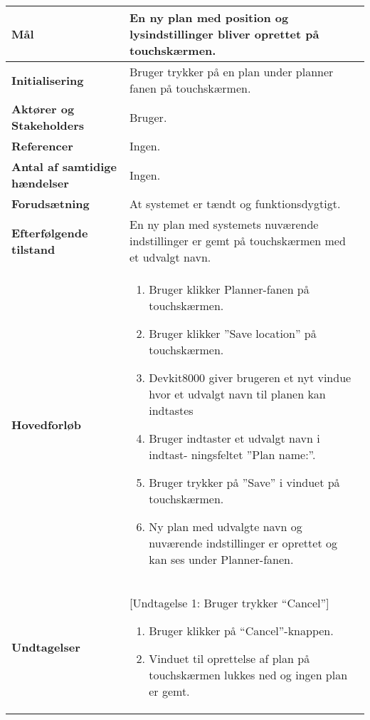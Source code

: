 \begin{center}
\begin{longtable}{|p{6cm}|p{8cm}|}
        \textbf{Mål}								
            & En ny plan med position og lysindstillinger bliver oprettet på touchskærmen.
        \\ \hline
        \textbf{Initialisering}					
            & Bruger trykker på en plan under planner fanen på touchskærmen.
        \\ \hline
        \textbf{Aktører og Stakeholders}			
            & Bruger.
        \\ \hline
        \textbf{Referencer}						
            & Ingen.
        \\ \hline
        \textbf{Antal af samtidige hændelser}	
            & Ingen.
        \\ \hline
        \textbf{Forudsætning}					
            & At systemet er tændt og funktionsdygtigt.
        \\ \hline
        \textbf{Efterfølgende tilstand}			
            & En ny plan med systemets nuværende indstillinger er gemt på touchskærmen med et udvalgt navn.
        \\ \hline
        \textbf{Hovedforløb}						
            &
            \begin{enumerate}
                \item Bruger klikker Planner-fanen på touchskærmen.
                \item Bruger klikker ”Save location” på touchskærmen.
                \item Devkit8000 giver brugeren et nyt vindue hvor et udvalgt navn til planen kan indtastes
                \item Bruger indtaster et udvalgt navn i indtast- ningsfeltet ”Plan name:”.
                \item Bruger trykker på ”Save” i vinduet på touchskærmen.     
                \item Ny plan med udvalgte navn og nuværende indstillinger er oprettet og kan ses under Planner-fanen.
            \end{enumerate}
        \\ \hline
        \textbf{Undtagelser}						
            & [Undtagelse 1: Bruger trykker “Cancel”]
             \begin{enumerate}
                \item Bruger klikker på “Cancel”-knappen.
                \item Vinduet til oprettelse af plan på touchskærmen lukkes ned og ingen plan er gemt.
             \end{enumerate}
        \\ \hline
	\end{longtable}
	\label{UC8} 
\end{center}